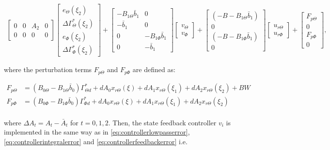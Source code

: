\documentclass[main.tex]{subfiles}
\begin{document}
\begin{align}
\begin{bmatrix}
0 & 0 & A_2 & 0 \\
0 & 0 & 0 & 0 
\end{bmatrix}
\begin{bmatrix}
e_\Theta(\xi_2) \\
\Delta \Gamma_\Theta^{*} (\xi_2) \\
e_\Phi(\xi_2) \\
\Delta \Gamma_\Phi^{*} (\xi_2) 
\end{bmatrix} + \begin{bmatrix}
-B_{1\Theta} \bar{b}_1 & 0 \\
-\bar{b}_1 & 0 \\
0 & -B_{1\Phi} \bar{b}_1  \\
0 & -\bar{b}_1 
\end{bmatrix}
\begin{bmatrix}
v_\Theta \\
v_\Phi
\end{bmatrix} + 
\begin{bmatrix}
(-B - B_{1\Theta}\bar{b}_1) \\
0 \\
(-B - B_{1\Phi}\bar{b}_1)  \\
0
\end{bmatrix}
\begin{bmatrix}
u_{r\Theta} \\
u_{r\Phi}
\end{bmatrix}
\label{eq:errordynamics2robust}+
\begin{bmatrix}
F_{p\Theta} \\
0 \\
F_{p\Phi} \\
0
\end{bmatrix},
\end{align}

where the perturbation terms $F_{p\Theta}$ and $F_{p\Phi}$ are defined as:

\begin{align}
	F_{p\Theta} &= (B_{0\Theta} - B_{1\Theta} \bar{b}_0)\Gamma_{\Theta d}^* + dA_0 x_{r\Theta} (\xi) + dA_1 x_{r\Theta} (\xi_1) + dA_2 x_{r\Theta} (\xi_2) + BW \label{eq:PerturbationForces1}\\
	F_{p\Phi} &= (B_{0\Phi} - B_{1\Phi} \bar{b}_0)\Gamma_{\Phi d}^* + dA_0 x_{r\Theta} (\xi) + dA_1 x_{r\Theta} (\xi_1) + dA_2 x_{r\Theta} (\xi_2) \label{eq:PerturbationForces2}\\
\end{align}

where $\Delta A_t = A_t - \bar{A}_t$ for $t = 0,1,2$. Then, the state feedback controller $v_i$ is implemented in the same way as in \eqref{eq:controllerlowpasserror}, \eqref{eq:controllerintegralerror} and \eqref{eq:controllerfeedbackerror} i.e.
\end{document}
